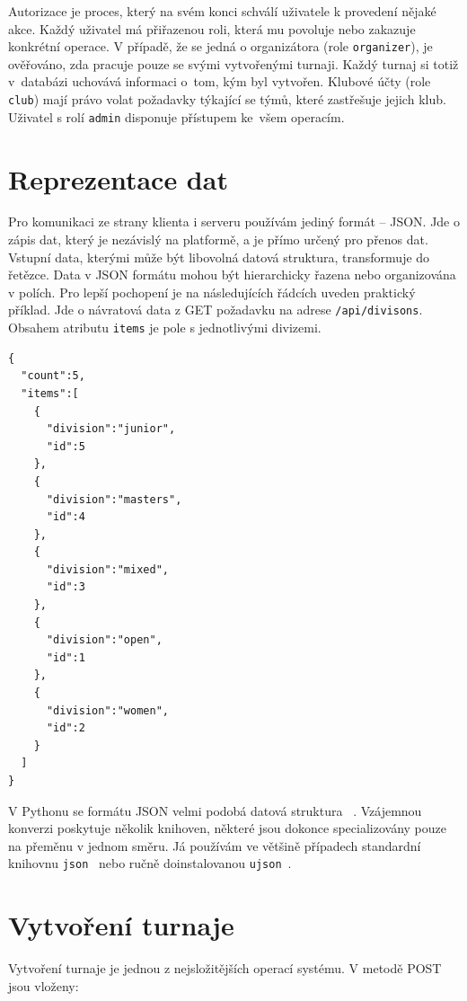 Autorizace je proces, který na svém konci schválí uživatele k provedení nějaké akce. Každý uživatel
má přiřazenou roli, která mu povoluje nebo zakazuje konkrétní operace. V případě, že
se jedná o organizátora (role \texttt{organizer}), je ověřováno, zda pracuje pouze se svými vytvořenými turnaji.
Každý turnaj si totiž v~databázi uchovává informaci o~tom, kým byl vytvořen. Klubové účty
(role \texttt{club}) mají právo volat požadavky týkající se týmů, které zastřešuje jejich klub.
Uživatel s rolí \texttt{admin} disponuje přístupem ke~všem operacím.

\section{Reprezentace dat}

Pro komunikaci ze strany klienta i serveru používám jediný formát -- JSON.
Jde o zápis dat, který je nezávislý na platformě, a je přímo určený pro přenos dat.
Vstupní data, kterými může být libovolná datová struktura, transformuje do řetězce.
Data v JSON formátu mohou být hierarchicky řazena nebo organizována v polích.
Pro lepší pochopení je na následujících řádcích uveden praktický příklad.
Jde o návratová data z GET požadavku na adrese \texttt{/api/divisons}.
Obsahem atributu \texttt{items} je pole s jednotlivými divizemi.

\begingroup
\fontsize{9.5pt}{11pt}\selectfont
\begin{lstlisting}[basicstyle=\small,style=json]
 {
  "count":5,
  "items":[
    {
      "division":"junior",
      "id":5
    },
    {
      "division":"masters",
      "id":4
    },
    {
      "division":"mixed",
      "id":3
    },
    {
      "division":"open",
      "id":1
    },
    {
      "division":"women",
      "id":2
    }
  ]
}
\end{lstlisting}
\endgroup

V Pythonu se formátu JSON velmi podobá datová struktura ~\cite{python_dict}.
Vzájemnou konverzi poskytuje několik knihoven, některé jsou dokonce specializovány pouze na přeměnu v jednom směru.
Já používám ve většině případech standardní knihovnu \texttt{json}~\cite{python_json}
nebo ručně doinstalovanou \texttt{ujson}~\cite{python_ujson}.

\section{Vytvoření turnaje}

Vytvoření turnaje je jednou z nejsložitějších operací systému. V metodě POST jsou vloženy:

